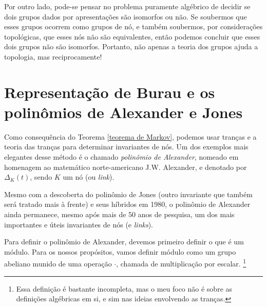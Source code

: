 	\par\vspace{0.3cm} Por outro lado, pode-se pensar no problema puramente algébrico de decidir 
	se dois grupos dados por apresentações são isomorfos ou não. Se soubermos que esses grupos 
	ocorrem como grupos de nó, e também soubermos, por considerações topológicas, que esses nós 
	não são equivalentes, então podemos concluir que esses dois grupos não são isomorfos. 
	Portanto, não apenas a teoria dos grupos ajuda a topologia, mas reciprocamente!
	
	\section{Representação de Burau e os polinômios de Alexander e Jones}
	Como consequência do Teorema \ref{teorema de Markov}, podemos usar tranças e a teoria 
	das tranças para determinar invariantes de nós. Um dos exemplos mais elegantes desse 
	método é o chamado \textit{polinômio de Alexander}, nomeado em homenagem ao matemático 
	norte-americano J.W. Alexander, e denotado por $\Delta_K(t)$, sendo $K$ um nó (ou \textit{link}).
	
	\par\vspace{0.3cm} Mesmo com a descoberta do polinômio de Jones (outro invariante que também 
	será tratado mais à frente) e seus híbridos em 1980, o polinômio de Alexander ainda permanece, 
	mesmo após mais de 50 anos de pesquisa, um dos mais importantes e úteis invariantes 
	de nós (e \textit{links}).
	
	\par\vspace{0.3cm} Para definir o polinômio de Alexander, devemos primeiro definir
	o que é um módulo. Para os nossos propósitos, vamos definir módulo como um grupo
	abeliano munido de uma operação $\cdot$, chamada de multiplicação por escalar.
	\footnote{Essa definição é bastante incompleta, mas o meu foco não é sobre as
	definições algébricas em si, e sim nas ideias envolvendo as tranças.}
	
